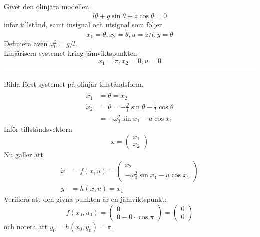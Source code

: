 \documentclass[12pt]{article}
\newcommand{\qline}{\hrule \vspace*{10pt}}
\begin{document}
Givet den olinjära modellen
\begin{equation*}
  l\ddot{\theta} + g\sin{\theta}
 + \ddot{z}\cos{\theta} = 0
\end{equation*}
inför tillstånd, samt insignal och utsignal som följer
\begin{equation*}
  x_1 = \theta, x_2 = \dot{\theta}, u = \ddot{z}/l, y = \theta
\end{equation*}
Definiera även $\omega_0^2 = g/l$. \\

Linjärisera systemet kring jämviktspunkten
\begin{equation*}
  x_1 = \pi, x_2 = 0, u = 0
\end{equation*}
\qline
Bilda först systemet på olinjär tillståndsform.
\begin{align*}
  \dot{x}_1 &= \dot{\theta} = x_2 \\
  \dot{x}_2 &= \ddot{\theta} = -\frac{g}{l}\sin{\theta} - \frac{\ddot{z}}{l}\cos{\theta} \\
  &= -\omega_0^2\sin{x_1} - u\cos{x_1}
\end{align*}
Inför tillståndsvektorn
\begin{equation*}
  x =
  \begin{pmatrix}
    x_1 \\
    x_2
  \end{pmatrix}
\end{equation*}
Nu gäller att
\begin{align*}
  \dot{x} &= f(x,u) =
            \begin{pmatrix}
              x_2 \\
              -\omega_0^2\sin{x_1} - u \cos{x_1}
            \end{pmatrix} \\
  y &= h(x,u) = x_1
\end{align*}
Verifiera att den givna punkten är en jämviktspunkt:
\begin{equation*}
  f(x_0,u_0) =
  \begin{pmatrix}
    0 \\
    0 - 0\cdot\cos{\pi}
  \end{pmatrix} =
  \begin{pmatrix}
    0 \\
    0
  \end{pmatrix}
\end{equation*}
och notera att $y_0 = h(x_0,y_0) = \pi$. \\
\end{document}
